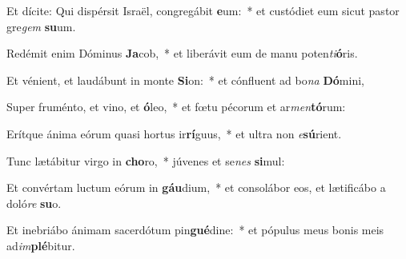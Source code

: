 \item Et dícite: Qui dispérsit Israël, congregábit \textbf{e}um:~* et custódiet eum sicut pastor gre\textit{gem} \textbf{su}um.
\item Redémit enim Dóminus \textbf{Ja}cob,~* et liberávit eum de manu poten\textit{ti}\textbf{ó}ris.
\item Et vénient, et laudábunt in monte \textbf{Si}on:~* et cónfluent ad bo\textit{na} \textbf{Dó}mini,
\item Super fruménto, et vino, et \textbf{ó}leo,~* et fœtu pécorum et ar\textit{men}\textbf{tó}rum:
\item Erítque ánima eórum quasi hortus ir\textbf{rí}guus,~* et ultra non \textit{e}\textbf{sú}rient.
\item Tunc lætábitur virgo in \textbf{cho}ro,~* júvenes et se\textit{nes} \textbf{si}mul:
\item Et convértam luctum eórum in \textbf{gáu}dium,~* et consolábor eos, et lætificábo a doló\textit{re} \textbf{su}o.
\item Et inebriábo ánimam sacerdótum pin\textbf{gué}dine:~* et pópulus meus bonis meis ad\textit{im}\textbf{plé}bitur.
